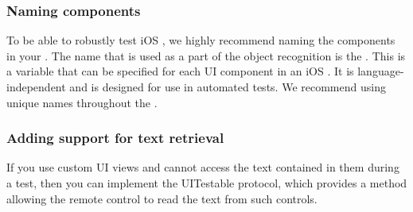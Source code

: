 
\subsubsection{Naming components}
To be able to robustly test iOS \gdauts{}, we highly recommend naming the components in your \gdaut{}. The name that is used as a part of the object recognition is the . This is a variable that can be specified for each UI component in an iOS \gdaut{}. It is language-independent and is designed for use in automated tests. We recommend using unique names throughout the \gdaut{}. 

\subsubsection{Adding support for text retrieval}
If you use custom UI views and cannot access the text contained in them during a test, then you can implement the UITestable protocol, which provides a method allowing the remote control to read the text from such controls. 
